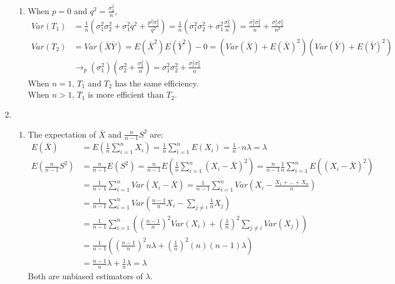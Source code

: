\documentclass{article}
\begin{document}
\begin{enumerate}
\begin{enumerate}[label=(\roman*)]
    \item When $p = 0$ and $q^2 = \frac{\sigma_2^2}{n}$,
    \begin{align*}
    Var(T_1) &= \frac{1}{n} \left( \sigma_1^2 \sigma_2^2 + \sigma_1^2 q^2 + \frac{p^2 \sigma_2^2}{q^2}\right) = \frac{1}{n} \left( \sigma_1^2 \sigma_2^2 + \sigma_1^2 \frac{\sigma_2^2}{n} \right) = \frac{\sigma_1^2 \sigma_2^2}{n} + \frac{\sigma_1^2 \sigma_2^2}{n^2} \\
    Var(T_2) &= Var(\bar{X} \bar{Y}) = E(\bar{X}^2) E(\bar{Y}^2) - 0 = (Var(\bar{X}) + E(\bar{X})^2) (Var(\bar{Y}) + E(\bar{Y})^2) \\
    & \rightarrow_p (\sigma_1^2)(\sigma_2^2 + \frac{\sigma_2^2}{n}) = \sigma_1^2 \sigma_2^2 + \frac{\sigma_1^2 \sigma_2^2}{n}
    \end{align*}
    When $n=1$, $T_1$ and $T_2$ has the same efficiency. \\
    When $n>1$, $T_1$ is more efficient than $T_2$.
    \end{enumerate}

\item
    \begin{enumerate}[label=(\roman*)]
    \item The expectation of $\bar{X}$ and $\frac{n}{n-1} S^2$ are:
    \begin{align*}
    E(\bar{X}) &= E(\frac{1}{n} \sum_{i=1}^n X_i) = \frac{1}{n} \sum_{i=1}^n E(X_i) = \frac{1}{n} \cdot n \lambda = \lambda \\
    E\left( \frac{n}{n-1} S^2 \right) &= \frac{n}{n-1} E(S^2) = \frac{n}{n-1} E(\frac{1}{n} \sum_{i=1}^n (X_i - \bar{X})^2) = \frac{n}{n-1} \frac{1}{n} \sum_{i=1}^n E((X_i - \bar{X})^2) \\
    &= \frac{1}{n-1} \sum_{i=1}^n Var(X_i - \bar{X}) = \frac{1}{n-1} \sum_{i=1}^n Var(X_i - \frac{X_1 + \dots + X_n}{n}) \\
    &= \frac{1}{n-1} \sum_{i=1}^n Var(\frac{n-1}{n} X_i - \sum_{j \neq i} \frac{1}{n} X_j) \\
    &= \frac{1}{n-1} \sum_{i=1}^n \left( \left( \frac{n-1}{n} \right)^2 Var(X_i) + \left( \frac{1}{n} \right)^2 \sum_{j \neq i} Var(X_j) \right) \\
    &= \frac{1}{n-1} \left( \left( \frac{n-1}{n} \right)^2 n \lambda + \left( \frac{1}{n} \right)^2 (n)(n-1) \lambda \right) \\
    &= \frac{n-1}{n} \lambda + \frac{1}{n} \lambda = \lambda
    \end{align*}
    Both are unbiased estimators of $\lambda$.


\end{enumerate}
\end{enumerate}
\end{document}
